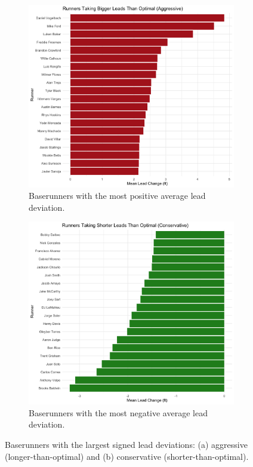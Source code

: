 \documentclass[12pt,letterpaper]{article}
\begin{document}
\begin{figure}[!htbp]
    \centering

    \begin{subfigure}[t]{0.6\textwidth}
        \centering
        \includegraphics[width=\linewidth]{figures/bigger-leads.png}
        \caption{Baserunners with the most positive average lead deviation.}
        \label{fig:runners_aggressive}
    \end{subfigure}

    \vspace{0.7em}

    \begin{subfigure}[t]{0.6\textwidth}
        \centering
        \includegraphics[width=\linewidth]{figures/shorter-leads.png}
        \caption{Baserunners with the most negative average lead deviation.}
        \label{fig:runners_conservative}
    \end{subfigure}

    \caption{Baserunners with the largest signed lead deviations: (a) aggressive (longer-than-optimal) and (b) conservative (shorter-than-optimal).}
    \label{fig:runners_tails}
\end{figure}
\end{document}
